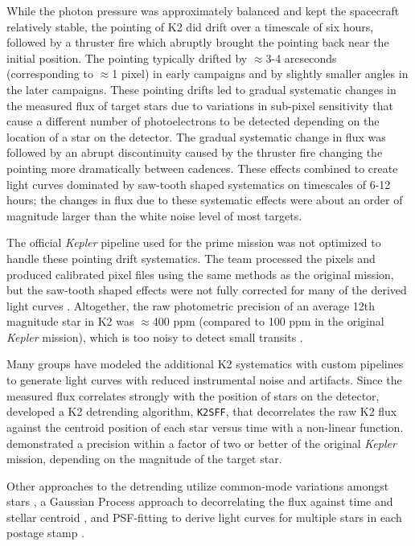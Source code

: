 \documentclass[twocolumn]{aastex62}
\newcommand{\project}[1]{\textsl{#1}}
\newcommand{\pipeline}[1]{\texttt{#1}}
\begin{document}
While the photon pressure was approximately balanced and kept the
spacecraft relatively stable, the pointing of K2 did drift over a
timescale of six hours, followed by a thruster fire which abruptly
brought the pointing back near the initial position.  The pointing
typically drifted by $\approx$3-4 arcseconds (corresponding to
$\approx$1 pixel) in early campaigns and by slightly smaller angles in
the later campaigns.  These pointing drifts led to gradual systematic
changes in the measured flux of target stars due to variations in
sub-pixel sensitivity that cause a different number of photoelectrons
to be detected depending on the location of a star on the detector.
The gradual systematic change in flux was followed by an abrupt
discontinuity caused by the thruster fire changing the pointing more
dramatically between cadences. These effects combined to create light
curves dominated by saw-tooth shaped systematics on timescales of 6-12
hours; the changes in flux due to these systematic effects were about
an order of magnitude larger than the white noise level of most
targets.

The official \project{Kepler} pipeline used for the prime mission was
not optimized to handle these pointing drift systematics. The team
processed the pixels and produced calibrated pixel files using the
same methods as the original mission, but the saw-tooth shaped effects
were not fully corrected for many of the derived light curves
\citep{how14}. Altogether, the raw photometric precision of an average
12th magnitude star in K2 was $\approx$400 ppm (compared to 100 ppm in
the original \project{Kepler} mission), which is too noisy to detect
small transits \citep{how14}.

Many groups have modeled the additional K2 systematics with custom
pipelines to generate light curves with reduced instrumental noise and
artifacts.  Since the measured flux correlates strongly with the
position of stars on the detector, \citet{van14} developed a K2
detrending algorithm, \pipeline{K2SFF}, that decorrelates the raw K2
flux against the centroid position of each star versus time with a
non-linear function.  \citet{van14} demonstrated a precision within a
factor of two or better of the original \project{Kepler} mission,
depending on the magnitude of the target star.

Other approaches to the detrending utilize common-mode variations
amongst stars \citep{mon15, for15}, a Gaussian Process approach to
decorrelating the flux against time and stellar centroid
\citep[\pipeline{K2SC};][]{aig16,pop16}, and PSF-fitting to derive
light curves for multiple stars in each postage stamp \citep{lun15}.
\end{document}
